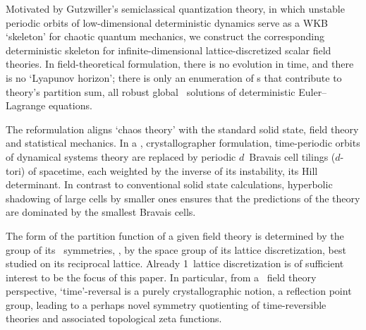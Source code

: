 

Motivated by Gutzwiller's semiclassical quantization theory, in which
unstable periodic orbits of low-dimensional deterministic dynamics serve
as a WKB `skeleton' for chaotic quantum mechanics, we
construct the corresponding deterministic skeleton for
infinite-dimensional lattice-discretized scalar field theories. In
field-theoretical formulation, there is no evolution in time, and there
is no `Lyapunov horizon'; there is only an enumeration of {\lattstate}s
that contribute to theory's partition sum, all robust global \spt\
solutions of deterministic Euler–Lagrange equations.

The reformulation aligns `chaos theory' with the standard solid state,
field theory and statistical mechanics. In a \spt,
crystallographer formulation, time-periodic orbits of dynamical systems
theory are replaced by periodic $d$\dmn\ {Bravais cell} tilings
($d$-tori) of spacetime, each weighted by the inverse of its instability,
its Hill determinant. In contrast to conventional solid state
calculations, hyperbolic shadowing of large cells by smaller ones ensures
that the predictions of the theory are dominated by the smallest Bravais
cells.

The form of the partition function of a given field theory is determined
by the group of its \spt\ symmetries, \ie, by the space group of its
lattice discretization, best studied on its reciprocal lattice. Already
1\dmn\ lattice discretization is of sufficient interest to be the focus
of this paper. In particular, from a \spt\ field theory perspective,
`time'-reversal is a purely crystallographic notion, a reflection point
group, leading to a perhaps novel symmetry quotienting of
time-reversible theories and associated topological zeta functions.
